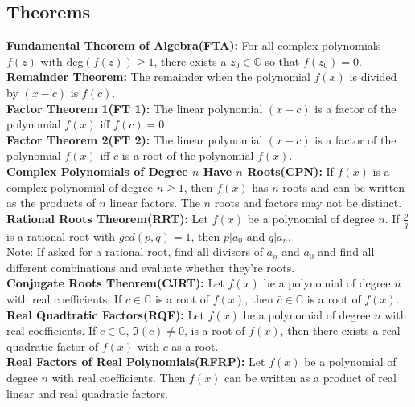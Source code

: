 \documentclass[12pt]{report}
\begin{document}
		\subsection{Theorems}
			\textbf{Fundamental Theorem of Algebra(FTA):} For all complex polynomials $f(z)$ with deg$(f(z)) \geq 1$, there exists a $z_0 \in \mathbb{C}$ so that $f(z_0) = 0$. \\
			\textbf{Remainder Theorem:} The remainder when the polynomial $f(x)$ is divided by $(x-c)$ is $f(c)$. \\
			\textbf{Factor Theorem 1(FT 1):} The linear polynomial $(x-c)$ is a factor of the polynomial $f(x)$ iff $f(c)=0$.\\
			\textbf{Factor Theorem 2(FT 2):} The linear polynomial $(x-c)$ is a factor of the polynomial $f(x)$ iff $c$ is a root of the polynomial $f(x)$.\\
			\textbf{Complex Polynomials of Degree $n$ Have $n$ Roots(CPN):} If $f(x)$ is a complex polynomial of degree $n \geq 1$, then $f(x)$ has $n$ roots and can be written as the products of $n$ linear factors. The $n$ roots and factors may not be distinct. \\
			\textbf{Rational Roots Theorem(RRT):} Let $f(x)$ be a polynomial of degree $n$. If $\frac{p}{q}$ is a rational root with $gcd(p,q) = 1$, then $p|a_0$ and $q|a_n$. \\
			Note: If asked for a rational root, find all divisors of $a_n$ and $a_0$ and find all different combinations and evaluate whether they're roots. \\
			\textbf{Conjugate Roots Theorem(CJRT):} Let $f(x)$ be a polynomial of degree $n$ with real coefficients. If $c \in \mathbb{C}$ is a root of $f(x)$, then $\bar{c} \in \mathbb{C}$ is a root of $f(x)$. \\
			\textbf{Real Quadtratic Factors(RQF):} Let $f(x)$ be a polynomial of degree $n$ with real coefficients. If $c \in \mathbb{C}$, $\Im(c) \neq 0$, is a root of $f(x)$, then there exists a real quadratic factor of $f(x)$ with $c$ as a root.\\
			\textbf{Real Factors of Real Polynomials(RFRP):} Let $f(x)$ be a polynomial of degree $n$ with real coefficients. Then $f(x)$ can be written as a product of real linear and real quadratic factors. 
			
\end{document}
